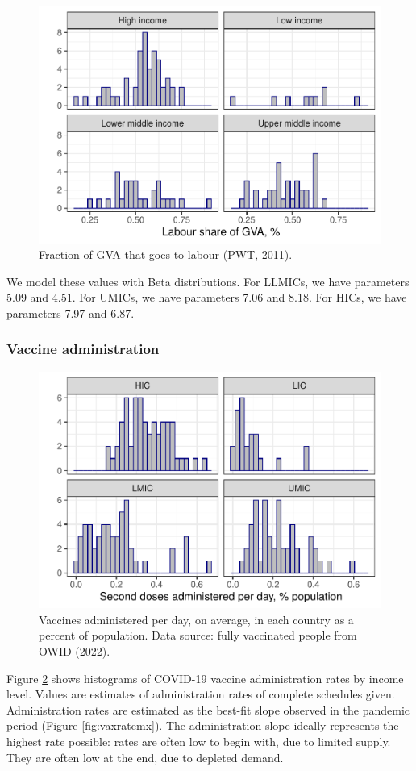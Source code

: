 \documentclass[
]{article}
\begin{document}
\begin{figure}
\includegraphics[width=0.5\linewidth]{README_files/figure-latex/labsh-1} \caption{Fraction of GVA that goes to labour (PWT, 2011).}\label{fig:labsh}
\end{figure}

We model these values with Beta distributions. For LLMICs, we have parameters 5.09 and 4.51. For UMICs, we have parameters 7.06 and 8.18. For HICs, we have parameters 7.97 and 6.87.

\subsubsection{Vaccine administration}\label{vaccine-administration}

\begin{figure}
\includegraphics[width=0.5\linewidth]{README_files/figure-latex/vaxrate-1} \caption{Vaccines administered per day, on average, in each country as a percent of population. Data source: fully vaccinated people from OWID (2022).}\label{fig:vaxrate}
\end{figure}

Figure \ref{fig:vaxrate} shows histograms of COVID-19 vaccine administration rates by income level. Values are estimates of administration rates of complete schedules given. Administration rates are estimated as the best-fit slope observed in the pandemic period (Figure \ref{fig:vaxratemx}). The administration slope ideally represents the highest rate possible: rates are often low to begin with, due to limited supply. They are often low at the end, due to depleted demand.
\end{document}
